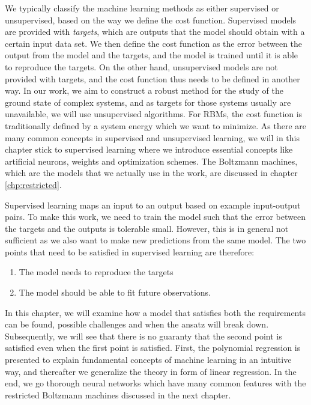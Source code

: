 We typically classify the machine learning methods as either supervised or unsupervised, based on the way we define the cost function. Supervised models are provided with \textit{targets}, which are outputs that the model should obtain with a certain input data set. We then define the cost function as the error between the output from the model and the targets, and the model is trained until it is able to reproduce the targets. On the other hand, unsupervised models are not provided with targets, and the cost function thus needs to be defined in another way. In our work, we aim to construct a robust method for the study of the ground state of complex systems, and as targets for those systems usually are unavailable, we will use unsupervised algorithms. For RBMs, the cost function is traditionally defined by a system energy which we want to minimize. As there are many common concepts in supervised and unsupervised learning, we will in this chapter stick to supervised learning where we introduce essential concepts like artificial neurons, weights and optimization schemes. The Boltzmann machines, which are the models that we actually use in the work, are discussed in chapter \ref{chp:restricted}.

Supervised learning maps an input to an output based on example input-output pairs. To make this work, we need to train the model such that the error between the targets and the outputs is tolerable small. However, this is in general not sufficient as we also want to make new predictions from the same model. The two points that need to be satisfied in supervised learning are therefore:
\begin{enumerate}
	\item The model needs to reproduce the targets
	\item The model should be able to fit future observations.
\end{enumerate}
In this chapter, we will examine how a model that satisfies both the requirements can be found, possible challenges and when the ansatz will break down. Subsequently, we will see that there is no guaranty that the second point is satisfied even when the first point is satisfied. First, the polynomial regression is presented to explain fundamental concepts of machine learning in an intuitive way, and thereafter we generalize the theory in form of linear regression. In the end, we go thorough neural networks which have many common features with the restricted Boltzmann machines discussed in the next chapter. 

